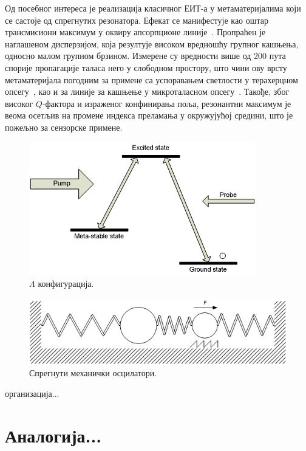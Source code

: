 \documentclass[main.tex]{subfiles}
\begin{document}
Од посебног интереса је реализација класичног ЕИТ-а у метаматеријалима који се састоје од спрегнутих резонатора. Ефекат се манифестује као оштар трансмисиони максимум у оквиру апсорпционе линије~\cite{tassin:09,cihan,mr05}. Пропраћен је наглашеном дисперзијом, која резултује високом вредношћу групног кашњења, односно малом групном брзином. Измерене су вредности више од 200 пута спорије пропагације таласа него у слободном простору, што чини ову врсту метаматеријала погодним за примене са успоравањем светлости у терахерцном опсегу~\cite{tassin:09}, као и за линије за кашњење у микроталасном опсегу~\cite{mr05}. Такође, због високог $Q$-фактора и израженог конфинирања поља, резонантни максимум је веома осетљив на промене индекса преламања у окружујућој средини, што је пожељно за сензорске примене.
\begin{figure}[h]
    \centering
    \includegraphics[width=0.8\linewidth]{sl_eit/lambda.png}
    \caption{$\Lambda$ конфигурација.}
    \label{fig:sl_eit/lambda}
\end{figure}
\begin{figure}[h]
    \centering
    \includegraphics[width=0.8\linewidth]{sl_eit/opruge.png}
    \caption{Спрегнути механички осцилатори.}
    \label{fig:sl_eit/opruge}
\end{figure}

организација...

\section{Аналогија...}
\end{document}
